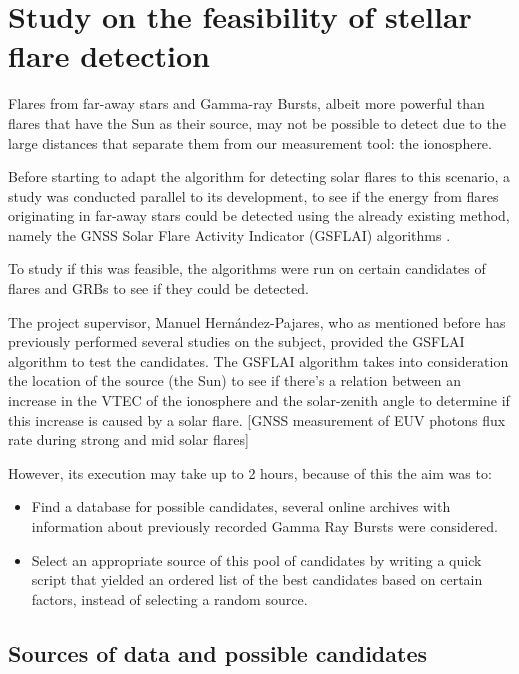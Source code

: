 \chapter{Study on the feasibility of stellar flare detection}

Flares from far-away stars and Gamma-ray Bursts, albeit more powerful than flares that have the Sun as their source, may not be possible to detect due to the large distances that separate them from our measurement tool: the ionosphere.

Before starting to adapt the algorithm for detecting solar flares to this scenario, a study was conducted parallel to its development, to see if the energy from flares originating in far-away stars could be detected using the already existing method, namely the GNSS Solar Flare Activity Indicator (GSFLAI) algorithms \cite{hernandez2012gnss}.

To study if this was feasible, the algorithms were run on certain candidates of flares and GRBs to see if they could be detected.

The project supervisor, Manuel Hernández-Pajares, who as mentioned before has previously performed several studies on the subject, provided the GSFLAI algorithm to test the candidates. The GSFLAI algorithm takes into consideration the location of the source (the Sun) to see if there's a relation between an increase in the VTEC of the ionosphere and the solar-zenith angle to determine if this increase is caused by a solar flare. [GNSS measurement of EUV photons flux rate
during strong and mid solar flares]

However, its execution may take up to 2 hours, because of this the aim was to:

\begin{itemize}
	\item Find a database for possible candidates, several online archives with information about previously recorded Gamma Ray Bursts were considered.
	\item Select an appropriate source of this pool of candidates by writing a quick script that yielded an ordered list of the best candidates based on certain factors, instead of selecting a random source.
\end{itemize}

\section{Sources of data and possible candidates}

